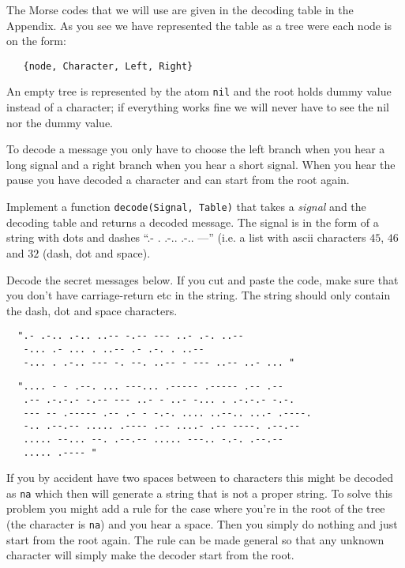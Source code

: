 \documentclass[a4paper,11pt]{article}
\begin{document}
The Morse codes that we will use are given in the decoding table in
the Appendix. As you see we have represented the table as a tree were
each node is on the form:

\begin{verbatim}
   {node, Character, Left, Right}
\end{verbatim}

An empty tree is represented by the atom {\tt nil} and the root holds
dummy value instead of a character; if everything works fine we
will never have to see the nil nor the dummy value.

To decode a message you only have to choose the left branch when you
hear a long signal and a right branch when you hear a short
signal. When you hear the pause you have decoded a character and can
start from the root again. 

Implement a function {\tt decode(Signal, Table)} that takes a {\em
  signal} and the decoding table and returns a decoded message. The
signal is in the form of a string with dots and dashes ``.-
. .-.. .-.. ---'' (i.e. a list with ascii characters $45$, $46$ and
$32$ (dash, dot and space).

Decode the secret messages below. If you cut and paste the code, make
sure that you don't have carriage-return etc in the string. The string
should only contain the dash, dot and space characters. 

\begin{verbatim}
  ".- .-.. .-.. ..-- -.-- --- ..- .-. ..-- 
   -... .- ... . ..-- .- .-. . ..-- 
   -... . .-.. --- -. --. ..-- - --- ..-- ..- ... "
\end{verbatim}

\begin{verbatim}
  ".... - - .--. ... ---... .----- .----- .-- .-- 
   .-- .-.-.- -.-- --- ..- - ..- -... . .-.-.- -.-. 
   --- -- .----- .-- .- - -.-. .... ..--.. ...- .----. 
   -.. .--.-- ..... .---- .-- ....- .-- ----. .--.-- 
   ..... --... --. .--.-- ..... ---.. -.-. .--.-- 
   ..... .---- "
\end{verbatim}

If you by accident have two spaces between to characters this might be
decoded as {\tt na} which then will generate a string that is not a
proper string. To solve this problem you might add a rule for the case
where you're in the root of the tree (the character is {\tt na}) and
you hear a space. Then you simply do nothing and just start from the
root again. The rule can be made general so that any unknown character
will simply make the decoder start from the root.
\end{document}

